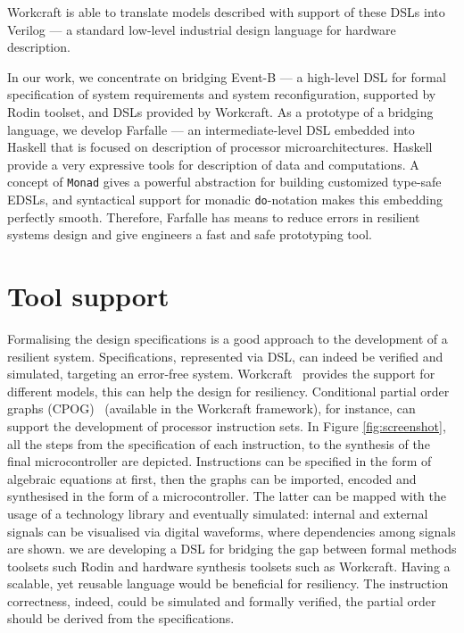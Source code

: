 \documentclass[conference]{IEEEtran}
\begin{document}
Workcraft is able to translate models described with support of these DSLs into
Verilog --- a standard low-level industrial design language for hardware
description.

In our work, we concentrate on bridging Event-B --- a high-level DSL
for formal specification of system requirements and system reconfiguration,
supported by Rodin toolset, and DSLs provided by Workcraft. As a
prototype of a bridging language, we develop Farfalle ---
an intermediate-level DSL embedded into Haskell that
is focused on description of processor microarchitectures.
Haskell provide a very expressive tools for description of data and
computations. A concept of \texttt{Monad} gives a powerful abstraction for
building customized type-safe EDSLs, and syntactical support for monadic
\texttt{do}-notation makes this embedding perfectly smooth. Therefore, Farfalle
has means to reduce errors in resilient systems design and give engineers a fast
and safe prototyping tool.


\section{Tool support}

Formalising the design specifications is a good approach to the development of a resilient
system. Specifications, represented via DSL, can indeed be verified and
simulated, targeting an error-free system. Workcraft~\cite{workcraft_web} provides the support for different
models, this can help the design for resiliency. Conditional partial order graphs (CPOG)~\cite{CPOG}
(available in the Workcraft framework), for instance, can support the development of
processor instruction sets. In Figure \ref{fig:screenshot}, all the steps from the
specification of each instruction, to the synthesis of the final microcontroller are
depicted. Instructions can be specified in the form of algebraic equations at first, then the
graphs can be imported, encoded and synthesised in the form of a microcontroller. The latter
can be mapped with the usage of a technology library and eventually simulated: internal and
external signals can be visualised via digital waveforms, where dependencies among signals
are shown. we are developing a DSL for bridging the gap between formal methods toolsets such
Rodin and hardware synthesis toolsets such as Workcraft. Having a scalable, yet
reusable language would be beneficial for resiliency. The instruction correctness, indeed,
could be simulated and formally verified, the partial order should be derived from the
specifications.
\end{document}
